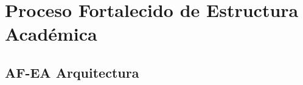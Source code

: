 
\chapter{Proceso Fortalecido de Estructura Académica}
\hypertarget{chapter:PFEA}{}

\section{AF-EA Arquitectura}


%	

